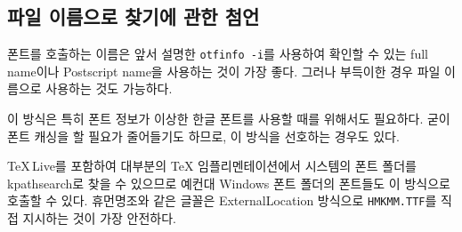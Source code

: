 \documentclass[
	12pt,
	a4paper,
	kosection,
	footnote,
	nobookmarks,
	microtype,
	figtabcapt,
]{oblivoir}
\def\util#1{\texttt{#1}}
\newcommand\xobclass{x\-ob\-liv\-oir\oblivoirallowbreak}
\begin{document}
\subsection{파일 이름으로 찾기에 관한 첨언}

폰트를 호출하는 이름은 앞서 설명한 \util{otfinfo -i}를 사용하여 확인할 수 있는
full name이나 Postscript name을 사용하는 것이 가장 좋다. 그러나 부득이한 경우 
파일 이름으로 사용하는 것도 가능하다.

이 방식은 특히 폰트 정보가 이상한 한글 폰트를 사용할 때를 위해서도
필요하다.
굳이 폰트 캐싱을 할 필요가 줄어들기도 하므로, 이 방식을 선호하는 경우도 있다.

\TeX\,Live를 포함하여 대부분의 \TeX{} 임플리멘테이션에서 시스템의 폰트 폴더를 kpathsearch로
찾을 수 있으므로 예컨대 Windows 폰트 폴더의 폰트들도 이 방식으로 호출할 수 있다.
휴먼명조와 같은 글꼴은 ExternalLocation 방식으로 \verb|HMKMM.TTF|를 
직접 지시하는 것이 가장 안전하다.
\end{document}
